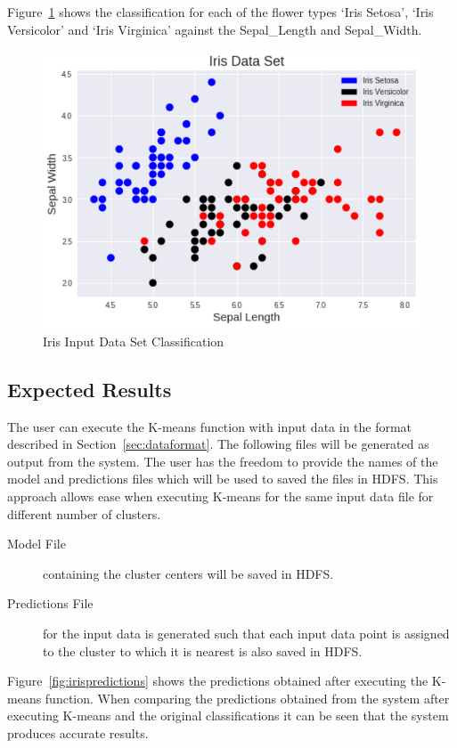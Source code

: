 Figure~\ref{fig:irisinputdata} shows the classification for each of the 
flower types `Iris Setosa', `Iris Versicolor' and `Iris Virginica' against the 
Sepal\_Length and Sepal\_Width.

\begin{figure}[htbp] 
	\centering
	\includegraphics[width=0.8\columnwidth]{images/irisinputdata.pdf}
	\caption{Iris Input Data Set Classification}
\label{fig:irisinputdata} 
\end{figure}

\subsection{Expected Results}

The user can execute the K-means function with input data in the format 
described in Section~\ref{sec:dataformat}. The following files will be 
generated as output from the system. The user has the freedom to provide the 
names of the model and predictions files which will be used to saved the files 
in HDFS. This approach allows ease when executing K-means for the same input 
data file for different number of clusters.

\begin{description}
	\item[Model File] containing the cluster centers will be saved in HDFS.
	\item[Predictions File] for the input data is 
	generated such that each input data point is assigned to the cluster to 
	which it is nearest is also saved in HDFS.
\end{description}

Figure~\ref{fig:irispredictions} shows the predictions obtained after 
executing the K-means function. When comparing the predictions obtained from 
the system after executing K-means and the original classifications it can be 
seen that the system produces accurate results.

